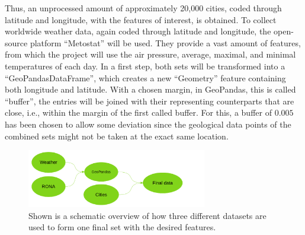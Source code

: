 Thus, an unprocessed amount of approximately 20,000 cities, coded through latitude and longitude, with the features of interest, is obtained. To collect worldwide weather data, again coded through latitude and longitude, the open-source platform \enquote{Metostat} \cite{metostat} will be used. They provide a vast amount of features, from which the project will use the air pressure, average, maximal, and minimal temperatures of each day. In a first step, both sets will be transformed into a \enquote{GeoPandasDataFrame}\cite{geopandas}, which creates a new \enquote{Geometry} feature containing both longitude and latitude. With a chosen margin, in GeoPandas, this is called \enquote{buffer}, the entries will be joined with their representing counterparts that are close, i.e., within the margin of the first called buffer. For this, a buffer of $0.005$ has been chosen to allow some deviation since the geological data points of the combined sets might not be taken at the exact same location.
\begin{figure}
    \centering
    \includegraphics[width = 0.7\textwidth]{images/data_graph.png}
    \caption{Shown is a schematic overview of how three different datasets are used to form one final set with the desired features.}
\end{figure}
